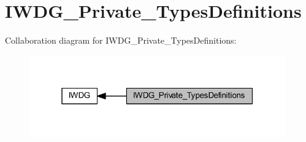 \hypertarget{group___i_w_d_g___private___types_definitions}{}\section{I\+W\+D\+G\+\_\+\+Private\+\_\+\+Types\+Definitions}
\label{group___i_w_d_g___private___types_definitions}
Collaboration diagram for I\+W\+D\+G\+\_\+\+Private\+\_\+\+Types\+Definitions\+:
\nopagebreak
\begin{figure}[H]
\begin{center}
\leavevmode
\includegraphics[width=313pt]{group___i_w_d_g___private___types_definitions}
\end{center}
\end{figure}
